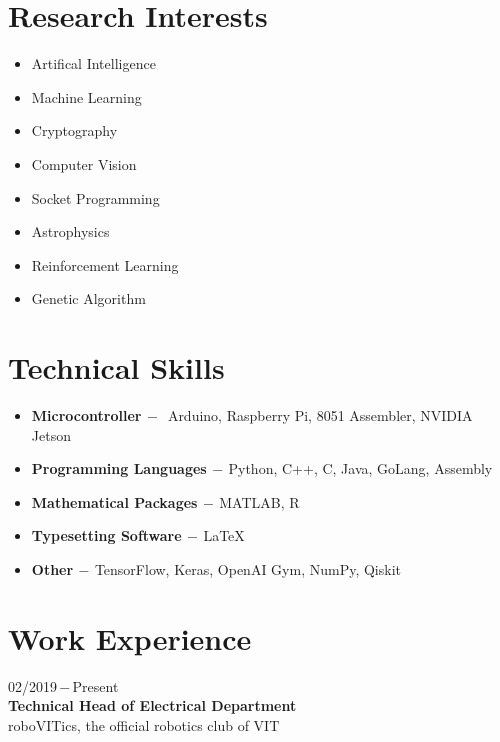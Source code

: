 \documentclass[a4paper, 12pt]{article}
\begin{document}
    \section*{Research Interests}
    \begin{multicols}{2}
    	\begin{itemize}
    		\item Artifical Intelligence
    		\item Machine Learning
    		\item Cryptography
    		\item Computer Vision
    		\item Socket Programming
    		\item Astrophysics
    		\item Reinforcement Learning
    		\item Genetic Algorithm
    	\end{itemize}
    \end{multicols}

    \section*{Technical Skills}
	\begin{flushleft}
	    \begin{itemize}
	    	\item \textbf{Microcontroller}$\,-\,$ Arduino, Raspberry Pi, 8051 Assembler, NVIDIA Jetson
	        \item \textbf{Programming Languages}$\,-\,$Python, C++, C, Java, GoLang, Assembly
	        \item \textbf{Mathematical Packages}$\,-\,$MATLAB, R
	        \item \textbf{Typesetting Software}$\,-\,$\LaTeX
	        \item \textbf{Other}$\,-\,$TensorFlow, Keras, OpenAI Gym, NumPy, Qiskit
	    \end{itemize}
	\end{flushleft}
	
	\section*{Work Experience}
    \begin{flushleft}
        02/2019\,$-$\,Present\\
        \textbf{Technical Head of Electrical Department}\\
        roboVITics, the official robotics club of VIT
    \end{flushleft}
    
\end{document}
